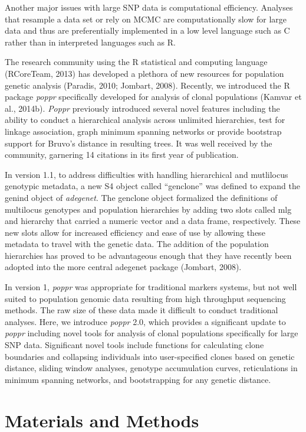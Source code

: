 \documentclass{frontiersSCNS} %
\begin{document}
Another major issues with large SNP data is computational efficiency.
Analyses that resample a data set or rely on MCMC are computationally
slow for large data and thus are preferentially implemented in a low
level language such as C rather than in interpreted languages such as R.

The research community using the R statistical and computing language
(RCoreTeam, 2013) has developed a plethora of new resources for
population genetic analysis (Paradis, 2010; Jombart, 2008). Recently, we
introduced the R package \emph{poppr} specifically developed for
analysis of clonal populations (Kamvar et al., 2014b). \emph{Poppr}
previously introduced several novel features including the ability to
conduct a hierarchical analysis across unlimited hierarchies, test for
linkage association, graph minimum spanning networks or provide
bootstrap support for Bruvo's distance in resulting trees. It was well
received by the community, garnering 14 citations in its first year of
publication.

In version 1.1, to address difficulties with handling hierarchical and
mutlilocus genotypic metadata, a new S4 object called ``genclone'' was
defined to expand the genind object of \emph{adegenet}. The genclone
object formalized the definitions of multilocus genotypes and population
hierarchies by adding two slots called mlg and hierarchy that carried a
numeric vector and a data frame, respectively. These new slots allow for
increased efficiency and ease of use by allowing these metadata to
travel with the genetic data. The addition of the population hierarchies
has proved to be advantageous enough that they have recently been
adopted into the more central adegenet package (Jombart, 2008).

In version 1, \emph{poppr} was appropriate for traditional markers
systems, but not well suited to population genomic data resulting from
high throughput sequencing methods. The raw size of these data made it
difficult to conduct traditional analyses. Here, we introduce
\emph{poppr} 2.0, which provides a significant update to \emph{poppr}
including novel tools for analysis of clonal populations specifically
for large SNP data. Significant novel tools include functions for
calculating clone boundaries and collapsing individuals into
user-specified clones based on genetic distance, sliding window
analyses, genotype accumulation curves, reticulations in minimum
spanning networks, and bootstrapping for any genetic distance.

\section*{Materials and Methods}\label{materials-and-methods}
\end{document}
